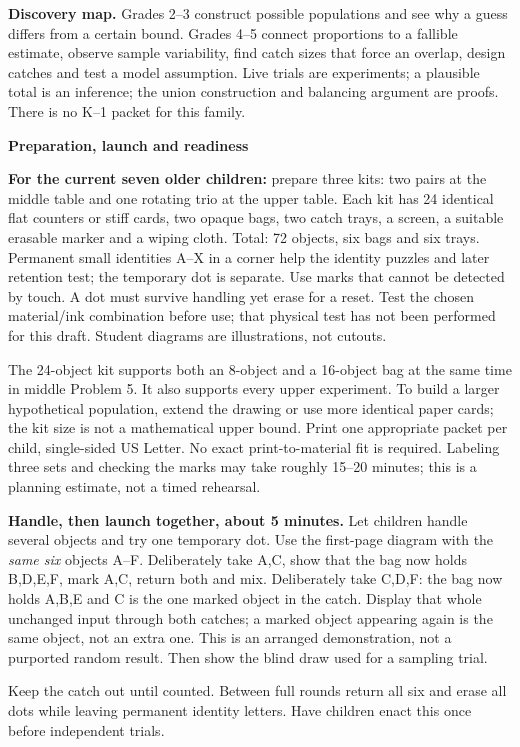 \documentclass[letterpaper,11pt]{article}
\newcommand{\topic}[1]{\par\medskip\textbf{#1}\par}
\begin{document}
\textbf{Discovery map.} Grades 2--3 construct possible populations and see why a guess differs from a certain bound. Grades 4--5 connect proportions to a fallible estimate, observe sample variability, find catch sizes that force an overlap, design catches and test a model assumption. Live trials are experiments; a plausible total is an inference; the union construction and balancing argument are proofs. There is no K--1 packet for this family.
\newpage
\topic{Preparation, launch and readiness}
\textbf{For the current seven older children:} prepare three kits: two pairs at the middle table and one rotating trio at the upper table. Each kit has 24 identical flat counters or stiff cards, two opaque bags, two catch trays, a screen, a suitable erasable marker and a wiping cloth. Total: 72 objects, six bags and six trays. Permanent small identities A--X in a corner help the identity puzzles and later retention test; the temporary dot is separate. Use marks that cannot be detected by touch. A dot must survive handling yet erase for a reset. Test the chosen material/ink combination before use; that physical test has not been performed for this draft. Student diagrams are illustrations, not cutouts.

The 24-object kit supports both an 8-object and a 16-object bag at the same time in middle Problem 5. It also supports every upper experiment. To build a larger hypothetical population, extend the drawing or use more identical paper cards; the kit size is not a mathematical upper bound. Print one appropriate packet per child, single-sided US Letter. No exact print-to-material fit is required. Labeling three sets and checking the marks may take roughly 15--20 minutes; this is a planning estimate, not a timed rehearsal.

\textbf{Handle, then launch together, about 5 minutes.} Let children handle several objects and try one temporary dot. Use the first-page diagram with the \emph{same six} objects A--F. Deliberately take A,C, show that the bag now holds B,D,E,F, mark A,C, return both and mix. Deliberately take C,D,F: the bag now holds A,B,E and C is the one marked object in the catch. Display that whole unchanged input through both catches; a marked object appearing again is the same object, not an extra one. This is an arranged demonstration, not a purported random result. Then show the blind draw used for a sampling trial.

Keep the catch out until counted. Between full rounds return all six and erase all dots while leaving permanent identity letters. Have children enact this once before independent trials.
\end{document}
